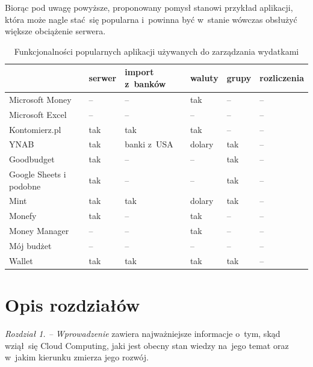 \documentclass[12pt,a4paper,twoside,titlepage,openright]{book}
\begin{document}
Biorąc pod uwagę powyższe, proponowany pomysł stanowi przykład aplikacji, która może nagle stać~się popularna i~powinna być w~stanie wówczas obsłużyć większe obciążenie serwera. 

\noindent
\begin{small}
\begin{table}[h]
%
\begin{tabularx}{\textwidth}{ |>{\hsize}L|>{\hsize}X|>{\hsize}X|>{\hsize}X|>{\hsize}X|>{\hsize}X| }

\hline
                & serwer & import z~banków & waluty  & grupy & rozliczenia \\
\hline
Microsoft Money & --     & --              & tak     &  --    & -- \\
\hline
Microsoft Excel & --     & --              & --      &  --    & -- \\
\hline
Kontomierz.pl   & tak    & tak             & tak     &  --    & -- \\
\hline
YNAB            & tak    & banki z~USA     & dolary  &  tak   & -- \\
\hline
Goodbudget      & tak    & --              & --      &  tak   & -- \\
\hline
Google Sheets i podobne
                & tak    & --              & --      &  tak   & -- \\
\hline
Mint            & tak    & tak             & dolary  &  tak   & -- \\
\hline
Monefy          & tak    & --              & tak     &  --    & -- \\
\hline
Money Manager   & --     & --              & tak     & --     & -- \\
\hline
Mój budżet      & --     & --              & --      & --     & -- \\
\hline
Wallet          & tak    & tak             & tak     & tak    & -- \\
\hline

\end{tabularx}


\caption{Funkcjonalności popularnych aplikacji używanych do zarządzania wydatkami}
		\label{table:programy}

\end{table}
\end{small}


\section*{Opis rozdziałów}
\textit{Rozdział 1. -- Wprowadzenie} zawiera najważniejsze informacje o~tym, skąd wziął~się Cloud Computing, jaki jest obecny stan wiedzy na~jego temat oraz w~jakim kierunku zmierza jego rozwój. 
\end{document}

